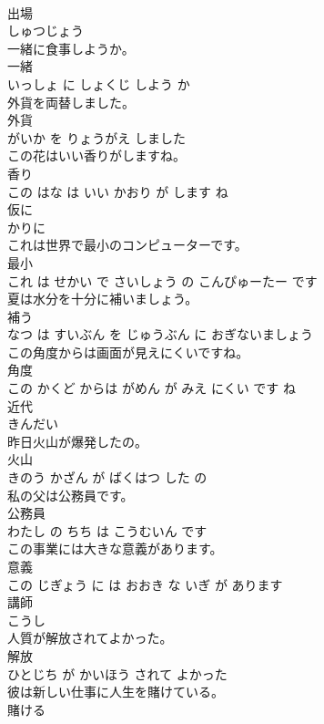 \documentclass[8pt]{extreport}
\begin{document}
\begin{CJK}{UTF8}{min}
\\	出場	
\\	しゅつじょう		
\\	一緒に食事しようか。	
\\	一緒 
\\	いっしょ に しょくじ しよう か			
\\	外貨を両替しました。	
\\	外貨 
\\	がいか を りょうがえ しました			
\\	この花はいい香りがしますね。	
\\	香り 
\\	この はな は いい かおり が します ね			
\\	仮に	
\\	かりに		
\\	これは世界で最小のコンピューターです。	
\\	最小 
\\	これ は せかい で さいしょう の こんぴゅーたー です			
\\	夏は水分を十分に補いましょう。	
\\	補う 
\\	なつ は すいぶん を じゅうぶん に おぎないましょう			
\\	この角度からは画面が見えにくいですね。	
\\	角度 
\\	この かくど からは がめん が みえ にくい です ね			
\\	近代	
\\	きんだい		
\\	昨日火山が爆発したの。	
\\	火山 
\\	きのう かざん が ばくはつ した の			
\\	私の父は公務員です。	
\\	公務員 
\\	わたし の ちち は こうむいん です			
\\	この事業には大きな意義があります。	
\\	意義 
\\	この じぎょう に は おおき な いぎ が あります			
\\	講師	
\\	こうし		
\\	人質が解放されてよかった。	
\\	解放 
\\	ひとじち が かいほう されて よかった			
\\	彼は新しい仕事に人生を賭けている。	
\\	賭ける 

\end{CJK}
\end{document}

